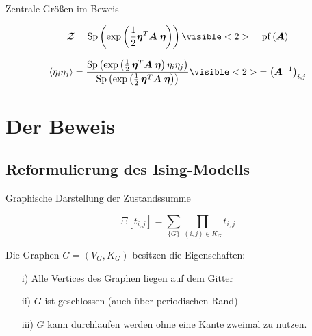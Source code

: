 \documentclass[11pt]{beamer}
\newcommand{\corr}[1]{\left\langle #1 \right\rangle}
\newcommand{\Sp}[1]{\mathrm{Sp}\left( #1 \right)}
\renewcommand{\exp}[1]{\mathrm{exp}\left( #1 \right)}
\newcommand{\pf}[1]{\mathrm{pf}\left( #1 \right)}
\begin{document}
    \begin{frame}{Zentrale Größen im Beweis}
    
    \begin{grayframe}[frametitle = {Graßmann Zustanssumme}]
    \begin{equation} \nonumber 
    \mathcal{Z} = \Sp{\exp{\frac{1}{2}\bm{\eta}^T \bm{A}\; \bm{\eta}}} \visible<2>{= \pf{\bm{A}}}
    \end{equation}
    \end{grayframe}
    \vspace{0.5cm}
    \begin{grayframe}[frametitle = {Graßmann Korreltation}]
    \begin{equation} \nonumber 
    \corr{\eta_{i}\eta_{j}} = \frac{ \Sp{\exp{\frac{1}{2}\,\bm{\eta}^T \bm{A}\; \bm{\eta}}\eta_{i}\eta_{j}}}{ \Sp{\exp{\frac{1}{2}\,\bm{\eta}^T \bm{A}\; \bm{\eta}}}} \visible<2>{= \left(\bm{A}^{-1}\right)_{i,j}}
    \end{equation}
    \end{grayframe}
    
    \end{frame}
    
\section{Der Beweis}
\subsection{Reformulierung des Ising-Modells}
    
    \begin{frame}{Graphische Darstellung der Zustandssumme}
    
    \begin{grayframe}
    \begin{equation} \nonumber
    \Xi [t_{i,j}] =  \sum_{\{G\}} \prod_{(i,j)\in K_{G}} t_{i,j}
    \end{equation} 
    \end{grayframe}
    \vspace{0.3cm}
    Die Graphen $G = (V_G, K_G)$ besitzen die Eigenschaften: 
    \begin{itemize}
    \item[i)] Alle Vertices des Graphen liegen auf dem Gitter
    \item[ii)] $G$ ist geschlossen (auch über periodischen Rand)
    \item[iii)] $G$ kann durchlaufen werden ohne eine Kante zweimal zu nutzen. 
    \end{itemize}

    \begin{figure}[h!]
        \centering
        \begin{tikzpicture}[scale = 0.8]
        
        \end{tikzpicture}
        \label{Abb: erlaubte Graphen}
    \end{figure}
    \end{frame}
    
\end{document}
